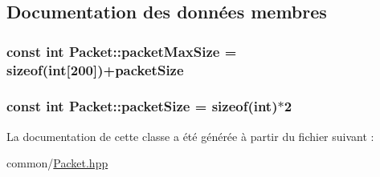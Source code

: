 \subsection{Documentation des données membres}
\hypertarget{classPacket_ab2ef9ab81c25a39ca3a09b954a5765a2}{}
\subsubsection[{packet\+Max\+Size}]{\setlength{\rightskip}{0pt plus 5cm}const int Packet\+::packet\+Max\+Size = sizeof(int\mbox{[}200\mbox{]})+{\bf packet\+Size}\hspace{0.3cm}{\ttfamily [static]}}\label{classPacket_ab2ef9ab81c25a39ca3a09b954a5765a2}
\hypertarget{classPacket_a4d3ec46364b14d6f59e550920ec9a78a}{}
\subsubsection[{packet\+Size}]{\setlength{\rightskip}{0pt plus 5cm}const int Packet\+::packet\+Size = sizeof(int)$\ast$2\hspace{0.3cm}{\ttfamily [static]}}\label{classPacket_a4d3ec46364b14d6f59e550920ec9a78a}


La documentation de cette classe a été générée à partir du fichier suivant \+:\begin{DoxyCompactItemize}
\item 
common/\hyperlink{Packet_8hpp}{Packet.\+hpp}\end{DoxyCompactItemize}
